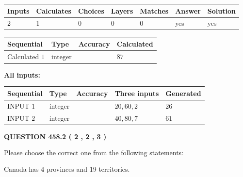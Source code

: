 \documentclass[12pt]{article}
\begin{document}
 

 
   
   
   
   
\noindent\begin{tabular}{|l|l|l|l|l|l|l|}
 \hline
Inputs & Calculates & Choices & Layers & Matches & Answer & Solution \\ \hline
 2  & 
 1  & 
 0
  & 
 0  & 
 0  & 
  yes & 
  yes 
  \\ \hline
 \end{tabular}
   
   
   
   
\noindent{}
   
   
  
  
\noindent\begin{tabular}{|l|l|l|l|}
\hline
 Sequential & Type & Accuracy & Calculated \\ 
\hline
 
 
  Calculated $  1 $ & integer &  & 
  $ 87 $ 
 \\  \hline  
 \end{tabular}
   
   
   
   
\noindent\vspace{0.1in}\hspace{-0.08in} {\textbf{\Large{All inputs: }}}
   
   
  
  
\noindent\begin{tabular}{|l|l|l|l|l|}
\hline
 Sequential & Type & Accuracy & Three inputs & Generated \\ 
\hline
 
 
  INPUT $  1 $ & integer &  & $
 20
 , 
 60
 , 
 2
 $ & $ 26 $ 
 \\  \hline  
 
 
  INPUT $  2 $ & integer &  & $
 40
 , 
 80
 , 
 7
 $ & $ 61 $ 
 \\  \hline  
 \end{tabular}
   
   
  
\vspace{0.2in}
  
{\textbf{\Large{QUESTION
458.2 
 ( 2 , 2 , 3 )
}}}
  
  
Please choose the correct one from the following statements:
 
 
Canada has   4 provinces and  19 territories.
 
\end{document}
